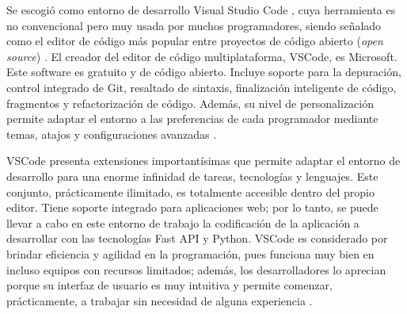 {{        Se escogió como entorno de desarrollo Visual Studio Code \citep{vscode2025}, cuya 
        herramienta es no convencional pero muy usada por muchos programadores, 
        siendo señalado como el editor de código más popular entre proyectos de código abierto 
        (\textit{open source}) \citep{ramel2021VSCodePopularity}.
        El creador del editor de código multiplataforma, VSCode, es Microsoft. Este software es
        gratuito y de código abierto. Incluye soporte para la depuración, control
        integrado de Git, resaltado de sintaxis, finalización inteligente de código,
        fragmentos y refactorización de código. Además, 
        su nivel de personalización permite adaptar el entorno a las preferencias de cada 
        programador mediante temas, atajos y configuraciones avanzadas \citep{vscode_docs2025}.

        VSCode presenta extensiones importantísimas que permite adaptar el
        entorno de desarrollo para una enorme infinidad de tareas, tecnologías y lenguajes. 
        Este conjunto, prácticamente ilimitado, es totalmente accesible
        dentro del propio editor. Tiene soporte integrado para aplicaciones web;
        por lo tanto, se puede llevar a cabo en este entorno de trabajo la
        codificación de la aplicación a desarrollar con las tecnologías Fast API y
        Python. VSCode es considerado por brindar eficiencia y agilidad en la
        programación, pues funciona muy bien en incluso equipos con recursos
        limitados; además, los desarrolladores lo aprecian porque su interfaz de
        usuario es muy intuitiva y permite comenzar, prácticamente, a trabajar sin
        necesidad de alguna experiencia \citep{vscode2025, vscode_docs2025}.

    }
}



